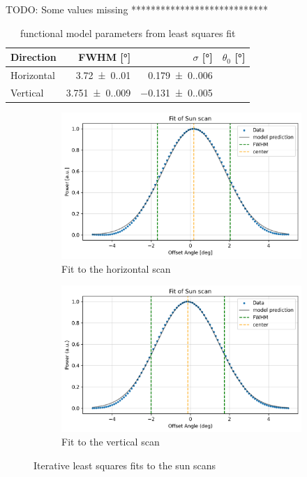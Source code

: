 TODO: Some values missing ****************************

\begin{table}[H]
    \centering
    \begin{tabular}{lrrr}
        \toprule
        Direction & FWHM [\si{\degree}]& $ \sigma$ [\si{\degree}] & $ \theta_0 $ [\si{\degree}]\\
        \midrule
        Horizontal & \SI{3.72(0.01)}{} & \SI{0.179(0.006)}{}\\
        Vertical & \SI{3.751(0.009)}{} & \SI{-0.131(0.005)}{}\\
        \bottomrule
    \end{tabular}
    \caption{functional model parameters from least squares fit}
    \label{tab:params}
\end{table}
\begin{figure}[H]
    \centering
    \begin{subfigure}[b]{0.45\textwidth}
        \centering
        \includegraphics[width=\textwidth]{assets/sun_scan_fit_h.png}
        \caption{Fit to the horizontal scan}
        \label{fig:sun_fit_h}
    \end{subfigure}
    \hfill
    \begin{subfigure}[b]{0.45\textwidth}
        \centering
        \includegraphics[width=\textwidth]{assets/sun_scan_fit_v.png}
        \caption{Fit to the vertical scan}
        \label{fig:sun_fit_v}
    \end{subfigure}
    \caption{Iterative least squares fits to the sun scans}
    \label{fig:sun_scan_fit}
\end{figure}
